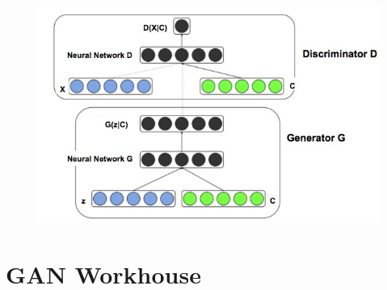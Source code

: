 \documentclass[a4paper]{article}
\begin{document}
\begin{enumerate}
{\begin{figure}[H]
  \includegraphics[scale=3]{images/my_conditional_gan.jpg}
  \label{fig:boat1}
\end{figure}

}
\end{enumerate}

\section{GAN Workhouse}
\end{document}
